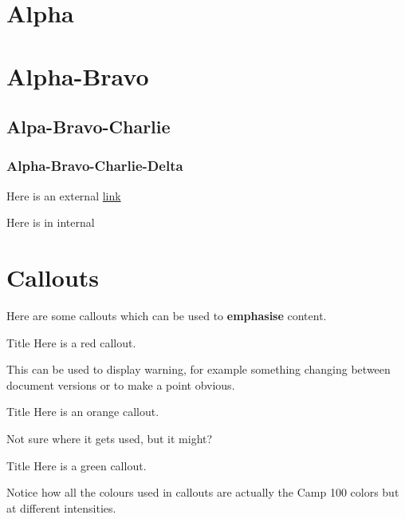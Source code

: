 \documentclass[a4paper, 11pt]{article}
\begin{document}
\makedocumenttitlepage


\section{Alpha}
\lipsum[1]
\section{Alpha-Bravo}
\subsection{Alpa-Bravo-Charlie}
\subsubsection{Alpha-Bravo-Charlie-Delta}
\lipsum[1-3]

Here is an external \href{https://camp100.org.uk}{link}

Here is in internal 

\section{Callouts}
Here are some callouts which can be used to \textbf{emphasise} content.

\begin{callout-red}{Title}
Here is a red callout.

This can be used to display warning, for example something changing between document versions or to make a point obvious.
\end{callout-red}

\begin{callout-orange}{Title}
Here is an orange callout.

Not sure where it gets used, but it might?
\end{callout-orange}

\begin{callout-green}{Title}
Here is a green callout.

Notice how all the colours used in callouts are actually the Camp 100 colors but at different intensities. 
\end{callout-green}
\end{document}
